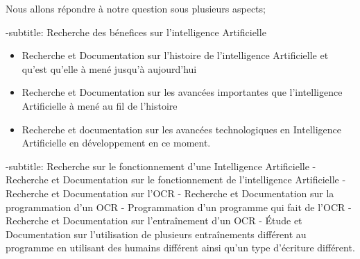 Nous allons répondre à notre question sous plusieurs aspects;

-subtitle: Recherche des bénefices sur l'intelligence Artificielle
\begin{itemize}
    \item Recherche et Documentation sur l'histoire de l'intelligence Artificielle 
et qu'est qu'elle à mené jusqu'à aujourd'hui
      
    \item Recherche et Documentation sur les avancées importantes que 
l'intelligence Artificielle à mené au fil de l'histoire
     
    \item Recherche et documentation sur les avancées technologiques en 
Intelligence Artificielle en développement en ce moment.
\end{itemize}
      
-subtitle: Recherche sur le fonctionnement d'une Intelligence Artificielle
    - Recherche et Documentation sur le fonctionnement de l'intelligence Artificielle
    - Recherche et Documentation sur l'OCR
    - Recherche et Documentation sur la programmation d'un OCR
    - Programmation d'un programme qui fait de l'OCR
    - Recherche et Documentation sur l'entraînement d'un OCR
    - Étude et Documentation sur l'utilisation de plusieurs entraînements différent au programme
      en utilisant des humains différent ainsi qu'un type d'écriture différent.
      
    
